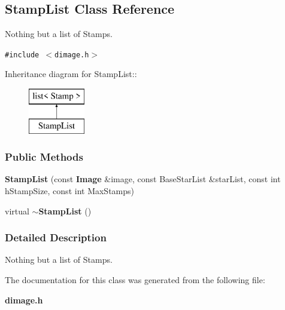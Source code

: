 \subsection{Stamp\-List  Class Reference}
\label{class_stamplist}
Nothing but a list of Stamps. 


{\tt \#include $<$dimage.h$>$}

Inheritance diagram for Stamp\-List::\begin{figure}[H]
\begin{center}
\leavevmode
\includegraphics[height=2cm]{class_stamplist}
\end{center}
\end{figure}
\subsubsection*{Public Methods}
\begin{CompactItemize}
\item 
{}
{\bf Stamp\-List} (const {\bf Image} \&image, const Base\-Star\-List \&star\-List, const int h\-Stamp\-Size, const int Max\-Stamps)\label{class_stamplist_a0}

\item 
{}
virtual {\bf $\sim$Stamp\-List} ()\label{class_stamplist_a1}

\end{CompactItemize}


\subsubsection{Detailed Description}
Nothing but a list of Stamps.



The documentation for this class was generated from the following file:\begin{CompactItemize}
\item 
{\bf dimage.h}\end{CompactItemize}
